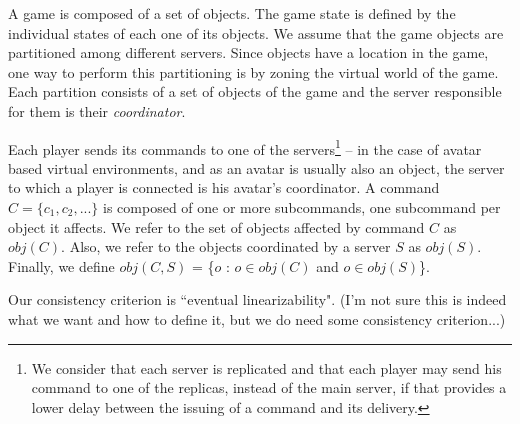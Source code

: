 \documentclass[times, 10pt]{article}
\begin{document}
A game is composed of a set of objects. The game state is defined by the individual states of each one of its objects. We assume that the game objects are partitioned among different servers. Since objects have a location in the game, one way to perform this partitioning is by zoning the virtual world of the game. Each partition consists of a set of objects of the game and the server responsible for them is their \emph{coordinator}.

Each player sends its commands to one of the servers\footnote{We consider that each server is replicated and that each player may send his command to one of the replicas, instead of the main server, if that provides a lower delay between the issuing of a command and its delivery.} -- in the case of avatar based virtual environments, and as an avatar is usually also an object, the server to which a player is connected is his avatar's coordinator. A command $C = \{ c_1, c_2, ... \}$ is composed of one or more subcommands, one subcommand per object it affects. We refer to the set of objects affected by command $C$ as $obj(C)$. Also, we refer to the objects coordinated by a server $S$ as $obj(S)$. Finally, we define $obj(C,S)$ = \{$o$ : $o \in obj(C)$ and $o \in obj(S)$\}.


Our consistency criterion is ``eventual linearizability". (I'm not sure this is indeed what we want and how to define it, but we do need some consistency criterion...)


% 
%
%
\end{document}

